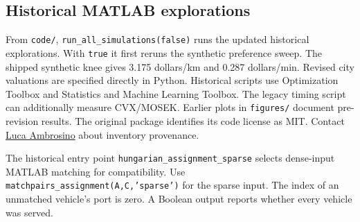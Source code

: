 \documentclass[11pt,a4paper]{article}
\begin{document}
\subsection*{Historical MATLAB explorations}
From \texttt{code/}, \texttt{run\_all\_simulations(false)} runs the updated historical explorations. With \texttt{true} it first reruns the synthetic preference sweep. The shipped synthetic knee gives 3.175 dollars/km and 0.287 dollars/min. Revised city valuations are specified directly in Python. Historical scripts use Optimization Toolbox and Statistics and Machine Learning Toolbox. The legacy timing script can additionally measure CVX/MOSEK. Earlier plots in \texttt{figures/} document pre-revision results. The original package identifies its code license as MIT. Contact \href{mailto:luca.ambrosino@polito.it}{Luca Ambrosino} about inventory provenance.

The historical entry point \texttt{hungarian\_assignment\_sparse} selects dense-input MATLAB matching for compatibility. Use \texttt{matchpairs\_assignment(A,C,'sparse')} for the sparse input. The index of an unmatched vehicle's port is zero. A Boolean output reports whether every vehicle was served.
\end{document}
